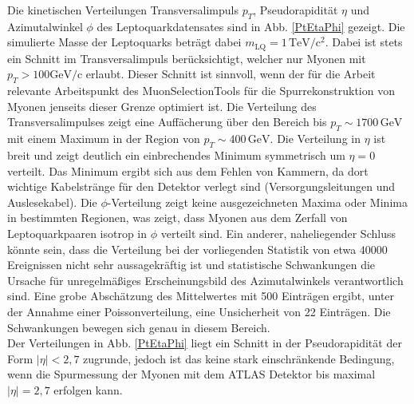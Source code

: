 Die kinetischen Verteilungen Transversalimpuls $p_T$, Pseudorapidität $\eta$ und Azimutalwinkel $\phi$ des Leptoquarkdatensates sind in Abb. \ref{PtEtaPhi} gezeigt. Die simulierte Masse der Leptoquarks beträgt dabei $m_{\text{LQ}}=1\,\text{TeV}/\text{c}^2$. Dabei ist stets ein Schnitt im Transversalimpuls berücksichtigt, welcher nur Myonen mit $p_T>100\text{GeV}/\text{c}$ erlaubt. Dieser Schnitt ist sinnvoll, wenn der für die Arbeit relevante Arbeitspunkt des MuonSelectionTools für die Spurrekonstruktion von Myonen jenseits dieser Grenze optimiert ist. Die Verteilung des Transversalimpulses zeigt eine Auffächerung über den Bereich bis $p_T\sim1700\,\text{GeV}$ mit einem Maximum in der Region von $p_T\sim400\,\text{GeV}$. Die Verteilung in $\eta$ ist breit und zeigt deutlich ein einbrechendes Minimum symmetrisch um $\eta=0$ verteilt. Das Minimum ergibt sich aus dem Fehlen von Kammern, da dort wichtige Kabelstränge für den Detektor verlegt sind (Versorgungsleitungen und Auslesekabel). Die $\phi$-Verteilung zeigt keine ausgezeichneten Maxima oder Minima in bestimmten Regionen, was zeigt, dass Myonen aus dem Zerfall von Leptoquarkpaaren isotrop in $\phi$ verteilt sind. %
Ein anderer, naheliegender Schluss könnte sein, dass die Verteilung bei der vorliegenden Statistik von etwa $40000$ Ereignissen nicht sehr aussagekräftig ist und statistische Schwankungen die Ursache für unregelmäßiges Erscheinungsbild des Azimutalwinkels verantwortlich sind. Eine grobe Abschätzung des Mittelwertes mit 500 Einträgen ergibt, unter der Annahme einer Poissonverteilung, eine Unsicherheit von 22 Einträgen. Die Schwankungen bewegen sich genau in diesem Bereich.\\ 
Der Verteilungen in Abb. \ref{PtEtaPhi} liegt ein Schnitt in der Pseudorapidität der Form $|\eta|<2{,}7$ zugrunde, jedoch ist das keine stark einschränkende Bedingung, wenn die Spurmessung der Myonen mit dem ATLAS Detektor bis maximal $|\eta|=2{,}7$ erfolgen kann.\\
% 
